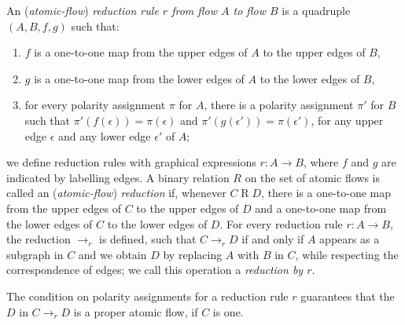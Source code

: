\documentclass[a4paper]{LMCS}
\begin{document}
\begin{defi}
An (\emph{atomic-flow}) \emph{reduction rule $r$ from flow $A$ to flow $B$} is a quadruple $(A,B,f,g)$ such that:
\begin{enumerate}
\item $f$ is a one-to-one map from the upper edges of $A$ to the upper edges of $B$,
\item $g$ is a one-to-one map from the lower edges of $A$ to the lower edges of $B$,
\item for every polarity assignment $\pi$ for $A$, there is a polarity assignment $\pi'$ for $B$ such that $\pi'(f(\epsilon))=\pi(\epsilon)$ and $\pi'(g(\epsilon'))=\pi(\epsilon')$, for any upper edge $\epsilon$ and any lower edge $\epsilon'$ of $A$;
\end{enumerate}
we define reduction rules with graphical expressions $r\colon A\to B$, where $f$ and $g$ are indicated by labelling edges. A binary relation $R$ on the set of atomic flows is called an (\emph{atomic-flow}) \emph{reduction} if, whenever $C\mathrel{R}D$, there is a one-to-one map from the upper edges of $C$ to the upper edges of $D$ and a one-to-one map from the lower edges of $C$ to the lower edges of $D$. For every reduction rule $r\colon A\to B$, the reduction ${\to_r}$ is defined, such that $C\to_r D$ if and only if $A$ appears as a subgraph in $C$ and we obtain $D$ by replacing $A$ with $B$ in $C$, while respecting the correspondence of edges; we call this operation a \emph{reduction by $r$}.
\end{defi}

\begin{rem}
The condition on polarity assignments for a reduction rule $r$ guarantees that the $D$ in $C\to_r D$ is a proper atomic flow, if $C$ is one.
\end{rem}
\end{document}
